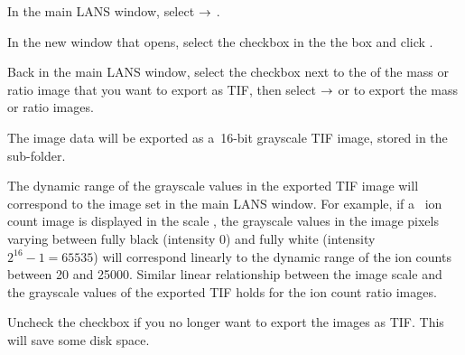 \s In the main LANS window, select  $\rightarrow$ .

\s In the new window that opens, select the  checkbox in the the  box and click .

\s Back in the main LANS window, select the  checkbox next to the  of the mass or ratio image that you want to export as TIF, then select  $\rightarrow$  or  to export the mass or ratio images.

\bul The image data will be exported as a~16-bit grayscale TIF image, stored in the  sub-folder. 

\bul The dynamic range of the grayscale values in the exported TIF image will correspond to the image  set in the main LANS window. For example, if a~ ion count image is displayed in the scale , the grayscale values in the image pixels varying between fully black (intensity 0) and fully white (intensity $2^{16}-1=65535$) will correspond linearly to the dynamic range of the ion counts between 20 and 25000. Similar linear relationship between the image scale and the grayscale values of the exported TIF holds for the ion count ratio images.

\s Uncheck the  checkbox if you no longer want to export the images as TIF. This will save some disk space.
